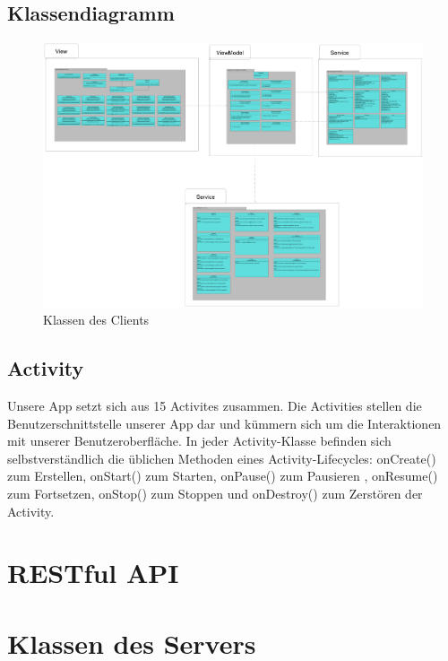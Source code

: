 \documentclass[a4paper]{scrreprt}
\begin{document}
	\subsection{Klassendiagramm}
	\begin{figure}[H]
	       \centering
	       \includegraphics[scale = .07]{all_client_packages.png}
	       \caption{Klassen des Clients}
	      \end{figure}
	
	
	 \subsection{Activity}
        Unsere App setzt sich aus 15 Activites zusammen. Die Activities stellen die Benutzerschnittstelle unserer App dar und kümmern sich um die Interaktionen mit unserer Benutzeroberfläche. In jeder Activity-Klasse befinden sich selbstverständlich die üblichen Methoden eines Activity-Lifecycles: onCreate() zum Erstellen, onStart() zum Starten, onPause() zum Pausieren , onResume() zum Fortsetzen, onStop() zum Stoppen und onDestroy() zum Zerstören der Activity.
	
	    
	\clearpage
	
	\clearpage
	
	\clearpage
	
	\clearpage
	\section{RESTful API}
	
	\clearpage
	\section{Klassen des Servers}
\end{document}
